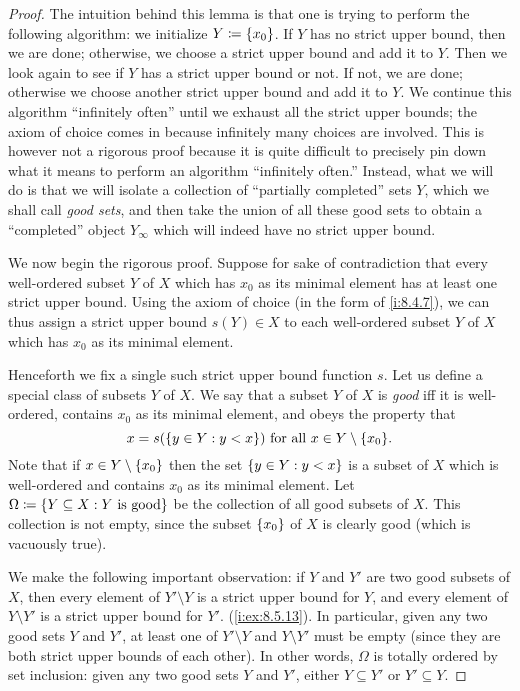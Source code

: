 \begin{proof}
  The intuition behind this lemma is that one is trying to perform the following algorithm:
  we initialize \(Y \coloneqq \left\lbrace x_0\right\rbrace\).
  If \(Y\) has no strict upper bound, then we are done;
  otherwise, we choose a strict upper bound and add it to \(Y\).
  Then we look again to see if \(Y\) has a strict upper bound or not.
  If not, we are done;
  otherwise we choose another strict upper bound and add it to \(Y\).
  We continue this algorithm ``infinitely often'' until we exhaust all the strict upper bounds;
  the axiom of choice comes in because infinitely many choices are involved.
  This is however not a rigorous proof because it is quite difficult to precisely pin down what it means to perform an algorithm ``infinitely often.''
  Instead, what we will do is that we will isolate a collection of ``partially completed'' sets \(Y\), which we shall call \emph{good sets}, and then take the union of all these good sets to obtain a ``completed'' object \(Y_{\infty}\) which will indeed have no strict upper bound.

  We now begin the rigorous proof.
  Suppose for sake of contradiction that every well-ordered subset \(Y\) of \(X\) which has \(x_0\) as its minimal element has at least one strict upper bound.
  Using the axiom of choice (in the form of \cref{i:8.4.7}), we can thus assign a strict upper bound \(s(Y) \in X\) to each well-ordered subset \(Y\) of \(X\) which has \(x_0\) as its minimal element.

  Henceforth we fix a single such strict upper bound function \(s\).
  Let us define a special class of subsets \(Y\) of \(X\).
  We say that a subset \(Y\) of \(X\) is \emph{good} iff it is well-ordered, contains \(x_0\) as its minimal element, and obeys the property that
  \[
    x = s(\set{y \in Y : y < x}) \text{ for all } x \in Y \setminus \set{x_0}.
  \]
  Note that if \(x \in Y \setminus \left\lbrace x_0\right\rbrace\) then the set \(\left\lbrace y \in Y : y < x\right\rbrace\) is a subset of \(X\) which is well-ordered and contains \(x_0\) as its minimal element.
  Let \(\Omega \coloneqq \left\lbrace Y \subseteq X : Y \text{ is good}\right\rbrace\) be the collection of all good subsets of \(X\).
  This collection is not empty, since the subset \(\left\lbrace x_0\right\rbrace\) of \(X\) is clearly good
  (which is vacuously true).

  We make the following important observation:
  if \(Y\) and \(Y'\) are two good subsets of \(X\), then every element of \(Y' \setminus Y\) is a strict upper bound for \(Y\), and every element of \(Y \setminus Y'\) is a strict upper bound for \(Y'\).
  (\cref{i:ex:8.5.13}).
  In particular, given any two good sets \(Y\) and \(Y'\), at least one of \(Y' \setminus Y\) and \(Y \setminus Y'\) must be empty
  (since they are both strict upper bounds of each other).
  In other words, \(\Omega\) is totally ordered by set inclusion:
  given any two good sets \(Y\) and \(Y'\), either \(Y \subseteq Y'\) or \(Y' \subseteq Y\).


\end{proof}
